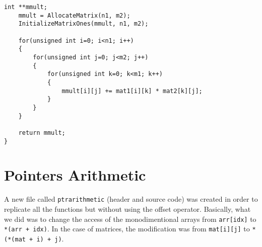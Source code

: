 \documentclass{article}
\begin{document}
\begin{lstlisting}[label=lst_n,caption=Bidimentional Dynamic Arrays]
	int **mmult;
	mmult = AllocateMatrix(n1, m2);
	InitializeMatrixOnes(mmult, n1, m2);

	for(unsigned int i=0; i<n1; i++)
	{
		for(unsigned int j=0; j<m2; j++)
		{
			for(unsigned int k=0; k<m1; k++)
			{
				mmult[i][j] += mat1[i][k] * mat2[k][j];
			}
		}
	}

	return mmult;
}
\end{lstlisting} 

\section{Pointers Arithmetic}

A new file called \verb+ptrarithmetic+ (header and source code) 
was created in order to replicate
all the functions but without using the offset operator. 
Basically, what we did was to change the access of the monodimentional
arrays from \verb;arr[idx]; to \verb;*(arr + idx);.
In the case of matrices, the modification was from
\verb+mat[i][j]+ to \verb;*(*(mat + i) + j);.  




\end{document}
